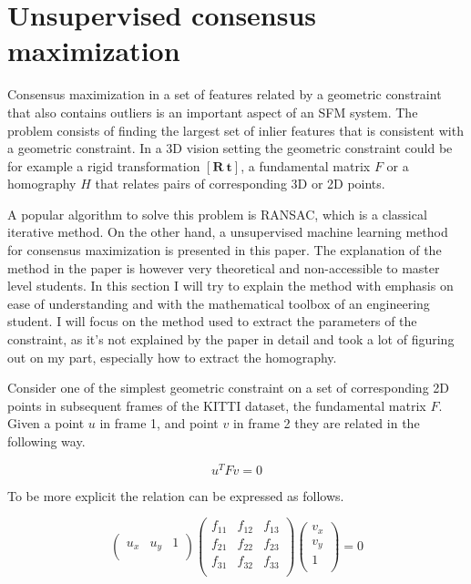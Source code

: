 \section{Unsupervised consensus maximization}

Consensus maximization in a set of features related by a geometric constraint that also contains outliers is an important aspect of an SFM system. The problem consists of finding the largest set of inlier features that is consistent with a geometric constraint. In a 3D vision setting the geometric constraint could be for example a rigid transformation $[\textbf{R}\ \textbf{t}]$, a fundamental matrix $F$ or a homography $H$ that relates pairs of corresponding 3D or 2D points.

A popular algorithm to solve this problem is RANSAC\cite{ransac}, which is a classical iterative method. On the other hand, a unsupervised machine learning method for consensus maximization is presented in this paper\cite{consensus}. The explanation  of the method in the paper is however very theoretical and non-accessible to master level students. In this section I will try to explain the method with emphasis on ease of understanding and with the mathematical toolbox of an engineering student. I will focus on the method used to extract the parameters of the constraint, as it's not explained by the paper in detail and took a lot of figuring out on my part, especially how to extract the homography.

Consider one of the simplest geometric constraint on a set of corresponding 2D points in subsequent frames of the KITTI dataset, the fundamental matrix $F$. Given a point $u$ in frame 1, and point $v$ in frame 2 they are related in the following way.

 \[
 u^T F v = 0
 \]
 
 To be more explicit the relation can be expressed as follows.
 
\[
\begin{pmatrix}
u_x & u_y & 1 \\
\end{pmatrix}
\begin{pmatrix}
f_{11} & f_{12} & f_{13} \\
f_{21} & f_{22} & f_{23} \\
f_{31} & f_{32} & f_{33} \\
\end{pmatrix}
\begin{pmatrix}
v_x \\
v_y \\
1 \\
\end{pmatrix}
= 0
\]

